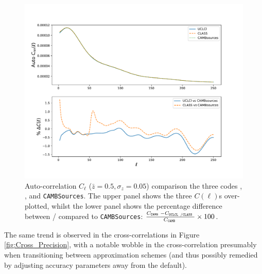 \begin{figure}
\begin{center}
\includegraphics[width=\textwidth]{BOSS-FIGS/PrecAutos.pdf}
\caption[Code comparison between \uclcl, \class, and \texttt{CAMBSources} for the auto-$C_{\ell}$s calculation.]{Auto-correlation $C_{\ell}$ ($\bar z = 0.5, \sigma_z = 0.05$) comparison the three codes \uclcl, \class, and \texttt{CAMBSources}. The upper panel shows the three $C(\ell)$s over-plotted, whilst the lower panel shows the percentage difference between \uclcl / \class compared to \texttt{CAMBSources}: $\frac{C_{\texttt{CAMB }}-C_{\texttt{UCLCL } / \texttt{CLASS }}}{C_{\texttt{CAMB }}}\times 100$.}
\label{fig:Auto_Precision}
\end{center}
\end{figure}

\qquad The same trend is observed in the cross-correlations in Figure \ref{fig:Cross_Precision}, with a notable wobble in the \class cross-correlation presumably when transitioning between approximation schemes (and thus possibly remedied by adjusting accuracy parameters away from the default). 



